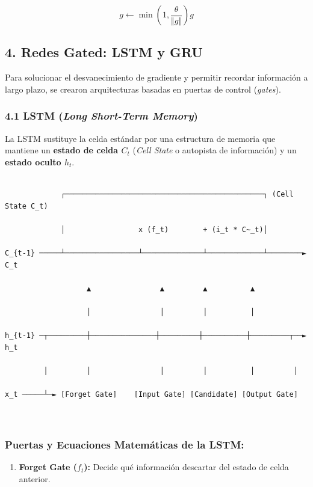 \documentclass[11pt,oneside]{article}
\begin{document}
\[g \leftarrow \min\left(1, \frac{\theta}{\Vert{}g\Vert{}}\right) g\]

\subsection{4. Redes Gated: LSTM y GRU}

Para solucionar el desvanecimiento de gradiente y permitir recordar información a largo plazo, se crearon arquitecturas basadas en puertas de control (\emph{gates}).

\subsubsection{4.1 LSTM (\emph{Long Short-Term Memory})}

La LSTM sustituye la celda estándar por una estructura de memoria que mantiene un \textbf{estado de celda \(C_t\)} (\emph{Cell State} o autopista de información) y un \textbf{estado oculto \(h_t\)}.

\begin{lstlisting}

             ┌──────────────────────────────────────────────┐ (Cell State C_t)

             │                 x (f_t)        + (i_t * C~_t)│

C_{t-1} ─────┴─────────────────┴──────────────┴─────────────┴────────► C_t

                   ▲                ▲         ▲          ▲

                   │                │         │          │

h_{t-1} ─┬─────────┼───────────────┼─────────┼──────────┼─────────┬──► h_t

         │         │                │         │          │         │

x_t ─────┴─► [Forget Gate]    [Input Gate] [Candidate] [Output Gate]



\end{lstlisting}

\subsubsection{Puertas y Ecuaciones Matemáticas de la LSTM:}

\begin{enumerate}

\item \textbf{Forget Gate (\(f_t\)):} Decide qué información descartar del estado de celda anterior.

\end{enumerate}
\end{document}
